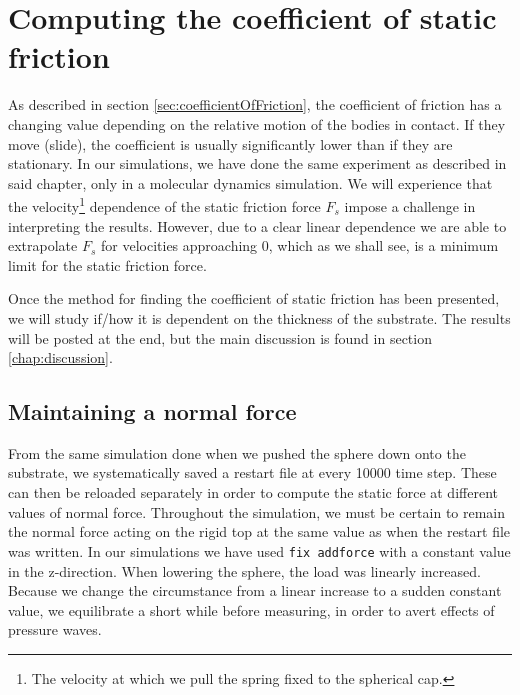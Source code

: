 \documentclass[twoside,english]{uiofysmaster}
\begin{document}
\chapter{Computing the coefficient of static friction} \label{chp:coefficientOfFriction}
As described in section \ref{sec:coefficientOfFriction}, the coefficient of friction has a changing value depending on the relative motion of the bodies in contact. 
If they move (slide), the coefficient is usually significantly lower than if they are stationary. 
In our simulations, we have done the same experiment as described in said chapter, only in a molecular dynamics simulation. 
We will experience that the velocity\footnote{The velocity at which we pull the spring fixed to the spherical cap.} dependence of the static friction force $F_s$ impose a challenge in interpreting the results.
However, due to a clear linear dependence we are able to extrapolate $F_s$ for velocities approaching 0, which as we shall see, is a minimum limit for the static friction force. 

Once the method for finding the coefficient of static friction has been presented, we will study if/how it is dependent on the thickness of the substrate.
The results will be posted at the end, but the main discussion is found in section \ref{chap:discussion}.

\section{Maintaining a normal force}
From the same simulation done when we pushed the sphere down onto the substrate, we systematically saved a restart file at every 10000 time step.
These can then be reloaded separately in order to compute the static force at different values of normal force.
Throughout the simulation, we must be certain to remain the normal force acting on the rigid top at the same value as when the restart file was written.
In our simulations we have used \texttt{fix addforce} with a constant value in the z-direction.
When lowering the sphere, the load was linearly increased. 
Because we change the circumstance from a linear increase to a sudden constant value, we equilibrate a short while before measuring, in order to avert effects of pressure waves.
\end{document}

